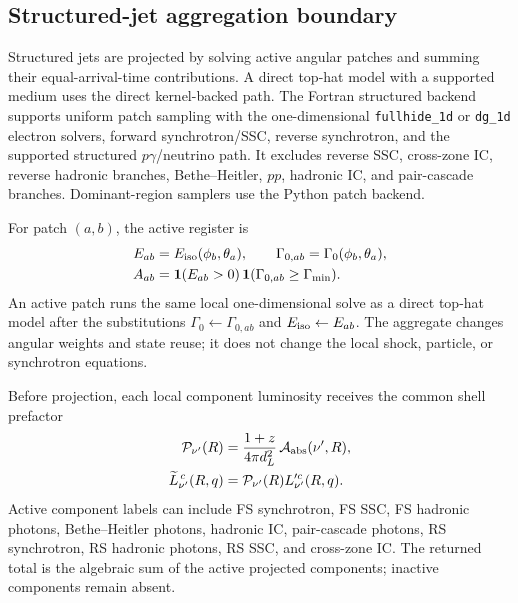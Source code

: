 \documentclass[twocolumn]{aastex702}
\begin{document}
\subsection{Structured-jet aggregation boundary}

Structured jets are projected by solving active angular patches and summing their
equal-arrival-time contributions.  A direct top-hat model with a supported medium
uses the direct kernel-backed path.  The Fortran structured backend supports
uniform patch sampling with the one-dimensional \texttt{fullhide\_1d} or
\texttt{dg\_1d} electron solvers, forward synchrotron/SSC, reverse synchrotron,
and the supported structured \(p\gamma\)/neutrino path.  It excludes reverse SSC,
cross-zone IC, reverse hadronic branches, Bethe--Heitler, \(pp\), hadronic IC,
and pair-cascade branches.  Dominant-region samplers use the Python patch
backend.

For patch \((a,b)\), the active register is
\begin{equation}
\begin{aligned}
E_{ab}&=E_{\rm iso}(\phi_b,\theta_a),\qquad
\Gamma_{0,ab}=\Gamma_0(\phi_b,\theta_a),\\
A_{ab}&=\mathbf{1}(E_{ab}>0)\,
\mathbf{1}(\Gamma_{0,ab}\ge\Gamma_{\min}).
\end{aligned}
\end{equation}
An active patch runs the same local one-dimensional solve as a direct top-hat
model after the substitutions
\(\Gamma_0\leftarrow\Gamma_{0,ab}\) and \(E_{\rm iso}\leftarrow E_{ab}\).  The
aggregate changes angular weights and state reuse; it does not change the local
shock, particle, or synchrotron equations.

Before projection, each local component luminosity receives the common shell
prefactor
\begin{equation}
\begin{aligned}
\mathcal{P}_{\nu'}(R)&=
\frac{1+z}{4\pi d_L^2}\,
\mathcal{A}_{\rm abs}(\nu',R),\\
\widetilde L_{\nu'}^{\,c}(R,q)&=
\mathcal{P}_{\nu'}(R)L_{\nu'}^{\prime c}(R,q).
\end{aligned}
\end{equation}
Active component labels can include FS synchrotron, FS SSC, FS hadronic photons,
Bethe--Heitler photons, hadronic IC, pair-cascade photons, RS synchrotron, RS
hadronic photons, RS SSC, and cross-zone IC.  The returned total is the algebraic
sum of the active projected components; inactive components remain absent.
\end{document}
